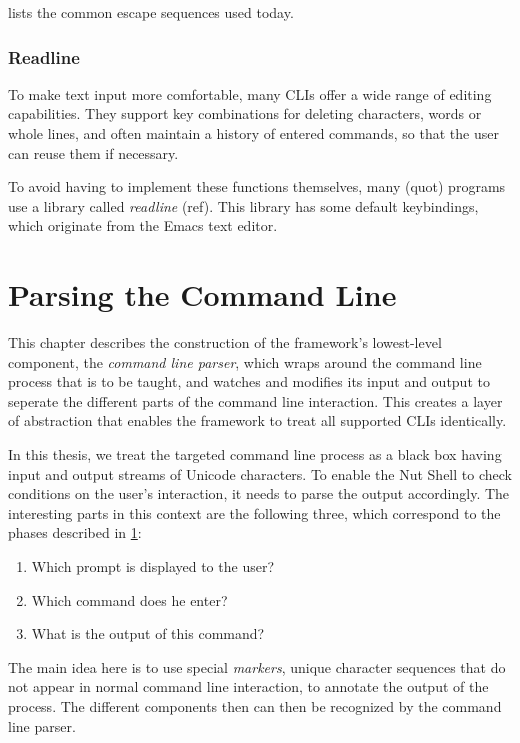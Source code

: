 \documentclass[paper=a4,twoside,abstract=on,cleardoublepage=empty,numbers=noenddot,toc=bib,12pt,appendixprefix=true]{scrreprt}
\begin{document}
 lists the common escape sequences used today.

\subsection{Readline}

To make text input more comfortable, many CLIs offer a wide range of editing capabilities. They support key combinations for deleting characters, words or whole lines, and often maintain a history of entered commands, so that the user can reuse them if necessary.

To avoid having to implement these functions themselves, many (quot) programs use a library called \emph{readline} (ref). This library has some default keybindings, which originate from the Emacs text editor.

\chapter{Parsing the Command Line}
\label{sec:cli}

This chapter describes the construction of the framework's lowest-level component, the \emph{command line parser}, which wraps around the command line process that is to be taught, and watches and modifies its input and output to seperate the different parts of the command line interaction. This creates a layer of abstraction that enables the framework to treat all supported CLIs identically.

In this thesis, we treat the targeted command line process as a black box having input and output streams of Unicode characters. To enable the Nut Shell to check conditions on the user's interaction, it needs to parse the output accordingly. The interesting parts in this context are the following three, which correspond to the phases described in \cref{sec:cli}:

\begin{enumerate}
    \item Which prompt is displayed to the user?
    \item Which command does he enter?
    \item What is the output of this command?
\end{enumerate}

The main idea here is to use special \emph{markers}, unique character sequences that do not appear in normal command line interaction, to annotate the output of the process. The different components then can then be recognized by the command line parser.
\end{document}
